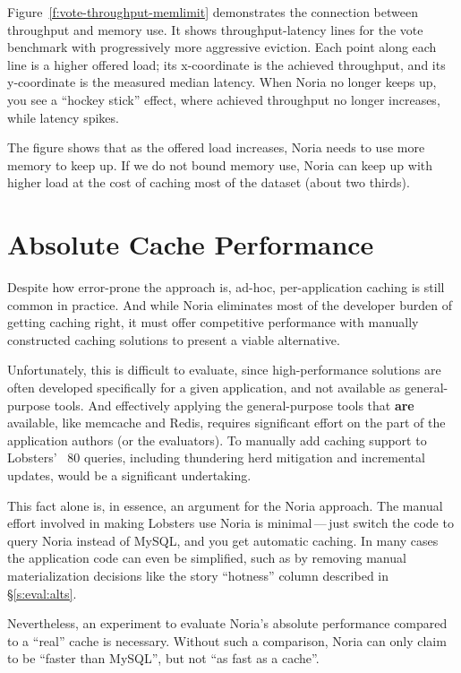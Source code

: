 Figure~\ref{f:vote-throughput-memlimit} demonstrates the connection between
throughput and memory use. It shows throughput-latency lines for the vote
benchmark with progressively more aggressive eviction. Each point along each
line is a higher offered load; its x-coordinate is the achieved throughput, and
its y-coordinate is the measured median latency. When Noria no longer keeps up,
you see a ``hockey stick'' effect, where achieved throughput no longer
increases, while latency spikes.

The figure shows that as the offered load increases, Noria needs to use more
memory to keep up. If we do not bound memory use, Noria can keep up with higher
load at the cost of caching most of the dataset (about two thirds).

\section{Absolute Cache Performance}
\label{s:eval:kvperf}

Despite how error-prone the approach is, ad-hoc, per-application caching is
still common in practice. And while Noria eliminates most of the developer
burden of getting caching right, it must offer competitive performance with
manually constructed caching solutions to present a viable alternative.

Unfortunately, this is difficult to evaluate, since high-performance solutions
are often developed specifically for a given application, and not available as
general-purpose tools. And effectively applying the general-purpose tools that
\textbf{are} available, like memcache and Redis, requires significant effort on
the part of the application authors (or the evaluators). To manually add caching
support to Lobsters' ~80 queries, including thundering herd mitigation and
incremental updates, would be a significant undertaking.

This fact alone is, in essence, an argument for the Noria approach. The manual
effort involved in making Lobsters use Noria is minimal\,---\,just switch the
code to query Noria instead of MySQL, and you get automatic caching. In many
cases the application code can even be simplified, such as by removing manual
materialization decisions like the story ``hotness'' column described in
\S\ref{s:eval:alts}.

Nevertheless, an experiment to evaluate Noria's absolute performance compared to
a ``real'' cache is necessary. Without such a comparison, Noria can only claim
to be ``faster than MySQL'', but not ``as fast as a cache''.

